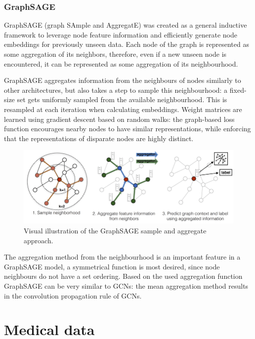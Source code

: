 	
	\subsubsection{GraphSAGE}
	
	GraphSAGE (graph SAmple and AggregatE) was created as a general inductive framework to leverage node feature information and efficiently generate node embeddings for previously unseen data\cite{graphasge_paper}. Each node of the graph is represented as some aggregation of its neighbors, therefore, even if a new unseen node is encountered, it can be represented as some aggregation of its neighbourhood. 
	
	GraphSAGE aggregates information from the neighbours of nodes similarly to other architectures, but also takes a step to sample this neighbourhood: a fixed-size set gets uniformly sampled from the available neighbourhood. This is resampled at each iteration when calculating embeddings. Weight matrices are learned using gradient descent based on random walks: the	graph-based loss function encourages nearby nodes to have similar representations, while enforcing that the representations of disparate nodes are highly distinct.
	
	\begin{figure}[!h]
		\centering
		\includegraphics[width=\textwidth]{figures/graphsage.png}
		\caption{Visual illustration of the GraphSAGE sample and aggregate approach.\cite{graphasge_paper}}
	\end{figure}
	
	The aggregation method from the neighbourhood is an important feature in a GraphSAGE model, a symmetrical function is most desired, since node neighbours do not have a set ordering. Based on the used aggregation function GraphSAGE can be very similar to GCNs: the mean aggregation method results in the convolution propagation rule of GCNs. 
	
\section{Medical data}

